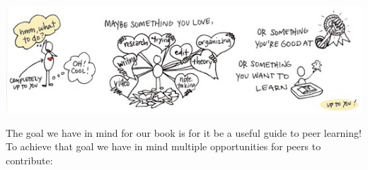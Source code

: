 \begin{center}
\href{http://peeragogy.org/wp-content/uploads/2012/03/what\_to\_do\_color.gif}{\includegraphics[width=.9\textwidth]{../pictures/what_to_do_color.jpg}}
\end{center}

The goal we have in mind for our book is for it be a useful guide to
peer learning! To achieve that goal we have in mind multiple
opportunities for peers to contribute:

